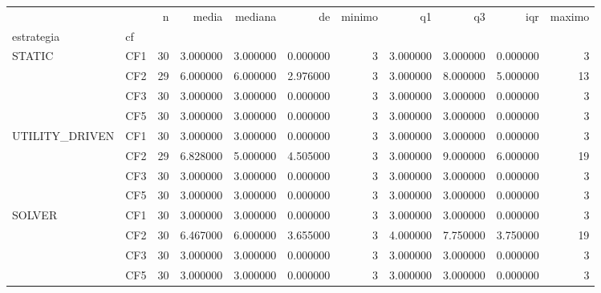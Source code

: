 \begin{tabular}{llrrrrrrrrr}
\toprule
 &  & n & media & mediana & de & minimo & q1 & q3 & iqr & maximo \\
estrategia & cf &  &  &  &  &  &  &  &  &  \\
\midrule
\multirow[t]{4}{*}{STATIC} & CF1 & 30 & 3.000000 & 3.000000 & 0.000000 & 3 & 3.000000 & 3.000000 & 0.000000 & 3 \\
 & CF2 & 29 & 6.000000 & 6.000000 & 2.976000 & 3 & 3.000000 & 8.000000 & 5.000000 & 13 \\
 & CF3 & 30 & 3.000000 & 3.000000 & 0.000000 & 3 & 3.000000 & 3.000000 & 0.000000 & 3 \\
 & CF5 & 30 & 3.000000 & 3.000000 & 0.000000 & 3 & 3.000000 & 3.000000 & 0.000000 & 3 \\
\cline{1-11}
\multirow[t]{4}{*}{UTILITY_DRIVEN} & CF1 & 30 & 3.000000 & 3.000000 & 0.000000 & 3 & 3.000000 & 3.000000 & 0.000000 & 3 \\
 & CF2 & 29 & 6.828000 & 5.000000 & 4.505000 & 3 & 3.000000 & 9.000000 & 6.000000 & 19 \\
 & CF3 & 30 & 3.000000 & 3.000000 & 0.000000 & 3 & 3.000000 & 3.000000 & 0.000000 & 3 \\
 & CF5 & 30 & 3.000000 & 3.000000 & 0.000000 & 3 & 3.000000 & 3.000000 & 0.000000 & 3 \\
\cline{1-11}
\multirow[t]{4}{*}{SOLVER} & CF1 & 30 & 3.000000 & 3.000000 & 0.000000 & 3 & 3.000000 & 3.000000 & 0.000000 & 3 \\
 & CF2 & 30 & 6.467000 & 6.000000 & 3.655000 & 3 & 4.000000 & 7.750000 & 3.750000 & 19 \\
 & CF3 & 30 & 3.000000 & 3.000000 & 0.000000 & 3 & 3.000000 & 3.000000 & 0.000000 & 3 \\
 & CF5 & 30 & 3.000000 & 3.000000 & 0.000000 & 3 & 3.000000 & 3.000000 & 0.000000 & 3 \\
\cline{1-11}
\bottomrule
\end{tabular}
